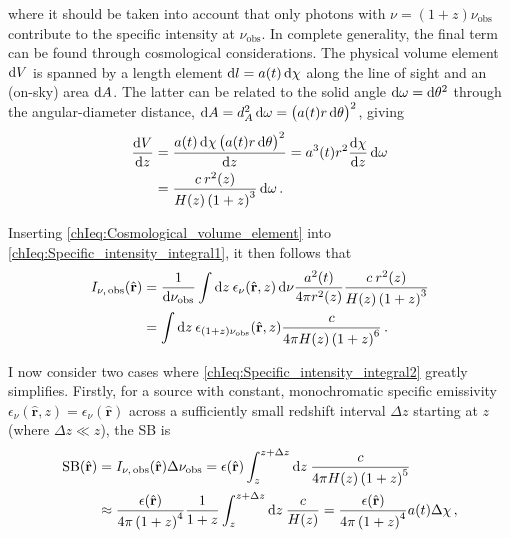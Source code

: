 \noindent where it should be taken into account that only photons with $\nu = (1 + z) \nu_\text{obs}$ contribute to the specific intensity at $\nu_\text{obs}$. In complete generality, the final term can be found through cosmological considerations. The physical volume element $\dif V$ is spanned by a length element $\dif l = a(t) \dif \chi$ along the line of sight and an (on-sky) area $\dif A$. The latter can be related to the solid angle $\dif \omega = \dif \theta^2$ through the angular-diameter distance, $\dif A = d_A^2 \dif \omega = \left( a(t) r \dif \theta \right)^2$, giving
\begin{align}
    \label{chIeq:Cosmological_volume_element}
    \frac{\dif V}{\dif z} & = \frac{a(t) \dif \chi \left( a(t) r \dif \theta \right)^2}{\dif z} = a^3(t) r^2 \frac{\dif \chi}{\dif z} \dif \omega \nonumber
    \\
    & = \frac{c \: r^2(z)}{H(z) \left( 1 + z \right)^3} \dif \omega \, .
\end{align}

Inserting \cref{chIeq:Cosmological_volume_element} into \cref{chIeq:Specific_intensity_integral1}, it then follows that
\begin{align}
    \label{chIeq:Specific_intensity_integral2}
    I_{\nu, \, \text{obs}} (\hat{\mathbf{r}}) & = \frac{1}{\dif \nu_\text{obs}} \int \dif z \: \epsilon_\nu (\hat{\mathbf{r}}, z) \dif \nu \frac{a^2(t)}{4 \pi r^2(z)} \frac{c \: r^2(z)}{H(z) \left( 1 + z \right)^3} \nonumber
    \\
    & = \int \dif z \: \epsilon_{(1 + z) \nu_\text{obs}} (\hat{\mathbf{r}}, z) \frac{c}{4 \pi H(z) \left( 1 + z \right)^6} \, .
\end{align}

I now consider two cases where \cref{chIeq:Specific_intensity_integral2} greatly simplifies. Firstly, for a source with constant, monochromatic specific emissivity $\epsilon_\nu (\hat{\mathbf{r}}, z) = \epsilon_\nu (\hat{\mathbf{r}})$ across a sufficiently small redshift interval $\Delta z$ starting at $z$ (where $\Delta z \ll z$), the SB is
\begin{align}
    \label{chIeq:Surface_brightness1}
    \text{SB} (\hat{\mathbf{r}}) & = I_{\nu, \, \text{obs}} (\hat{\mathbf{r}}) \Delta \nu_\text{obs} = \epsilon (\hat{\mathbf{r}}) \int_z^{z+\Delta z} \dif z \: \frac{c}{4 \pi H(z) \left( 1 + z \right)^5} \nonumber
    \\
    & \approx \frac{\epsilon (\hat{\mathbf{r}})}{4 \pi \left( 1 + z \right)^4} \frac{1}{1 + z} \int_z^{z+\Delta z} \dif z \: \frac{c}{H(z)} = \frac{\epsilon (\hat{\mathbf{r}})}{4 \pi \left( 1 + z \right)^4} a(t) \Delta \chi \, ,
\end{align}

